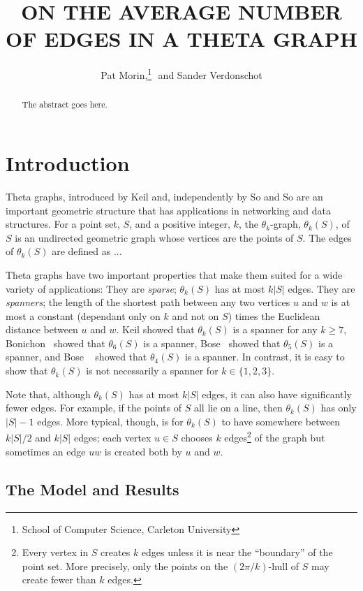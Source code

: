 \documentclass{patmorin}
\title{\MakeUppercase{On the Average Number of Edges in a Theta Graph}}
\author{Pat Morin,\thanks{School of Computer Science, Carleton University}\,\,
         and Sander Verdonschot\footnotemark[1]}
\begin{document}
\maketitle

\begin{abstract}
  The abstract goes here.
\end{abstract}

\section{Introduction}

Theta graphs, introduced by Keil \cite{A} and, independently by So and
So \cite{} are an important geometric structure that has applications
in networking \cite{A} and data structures.  For a point set, $S$, and
a positive integer, $k$, the $\theta_k$-graph, $\theta_k(S)$, of $S$
is an undirected geometric graph whose vertices are the points of $S$.
The edges of $\theta_k(S)$ are defined as ...

Theta graphs have two important properties that make them suited for
a wide variety of applications:  They are \emph{sparse}; $\theta_k(S)$
has at most $k|S|$ edges.  They are \emph{spanners}; the length of the
shortest path between any two vertices $u$ and $w$ is at most a constant
(dependant only on $k$ and not on $S$) times the Euclidean distance
between $u$ and $w$.  Keil \cite{kXX} showed that $\theta_k(S)$ is a
spanner for any $k\ge 7$, Bonichon \etal\ showed that $\theta_6(S)$
is a spanner,  Bose \etal\ showed that $\theta_5(S)$ is a spanner,
and Bose \etal\ \cite{bXX} showed that $\theta_4(S)$ is a spanner.
In contrast, it is easy to show that $\theta_k(S)$ is not necessarily
a spanner for $k\in\{1,2,3\}$.

Note that, although $\theta_k(S)$ has at most $k|S|$ edges, it can also
have significantly fewer edges.  For example, if the points of $S$ all
lie on a line, then $\theta_k(S)$ has only $|S|-1$ edges.  More typical,
though, is for $\theta_k(S)$ to have somewhere between $k|S|/2$ and $k|S|$
edges;  each vertex $u\in S$ chooses $k$ edges\footnote{Every vertex in
$S$ creates $k$ edges unless it is near the ``boundary'' of the point set.
More precisely, only the points on the $(2\pi/k)$-hull \cite{alpha-hull}
of $S$ may create fewer than $k$ edges.} of the graph but sometimes an
edge $uw$ is created both by $u$ and $w$.

\subsection{The Model and Results}
\end{document}
